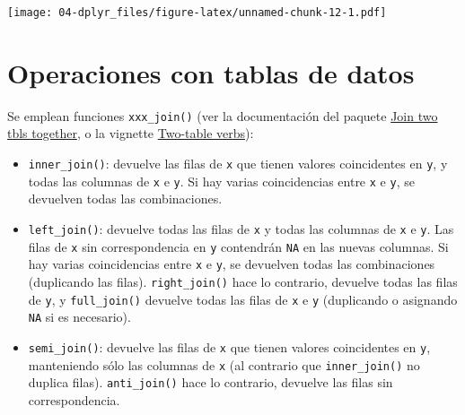 \documentclass[]{book}
\newenvironment{Shaded}{\begin{snugshade}}{\end{snugshade}}
\newcommand{\KeywordTok}[1]{\textcolor[rgb]{0.13,0.29,0.53}{\textbf{#1}}}
\newcommand{\DataTypeTok}[1]{\textcolor[rgb]{0.13,0.29,0.53}{#1}}
\newcommand{\DecValTok}[1]{\textcolor[rgb]{0.00,0.00,0.81}{#1}}
\newcommand{\StringTok}[1]{\textcolor[rgb]{0.31,0.60,0.02}{#1}}
\newcommand{\OperatorTok}[1]{\textcolor[rgb]{0.81,0.36,0.00}{\textbf{#1}}}
\newcommand{\NormalTok}[1]{#1}
\begin{document}
\begin{Shaded}
\end{Shaded}

\texttt{[image: 04-dplyr\_files/figure-latex/unnamed-chunk-12-1.pdf]}

\section{Operaciones con tablas de
datos}\label{operaciones-con-tablas-de-datos-1}

Se emplean funciones \texttt{xxx\_join()} (ver la documentación del
paquete \href{https://dplyr.tidyverse.org/reference/join.html}{Join two
tbls together}, o la vignette
\href{https://dplyr.tidyverse.org/articles/two-table.html}{Two-table
verbs}):

\begin{itemize}
\item
  \texttt{inner\_join()}: devuelve las filas de \texttt{x} que tienen
  valores coincidentes en \texttt{y}, y todas las columnas de \texttt{x}
  e \texttt{y}. Si hay varias coincidencias entre \texttt{x} e
  \texttt{y}, se devuelven todas las combinaciones.
\item
  \texttt{left\_join()}: devuelve todas las filas de \texttt{x} y todas
  las columnas de \texttt{x} e \texttt{y}. Las filas de \texttt{x} sin
  correspondencia en \texttt{y} contendrán \texttt{NA} en las nuevas
  columnas. Si hay varias coincidencias entre \texttt{x} e \texttt{y},
  se devuelven todas las combinaciones (duplicando las filas).
  \texttt{right\_join()} hace lo contrario, devuelve todas las filas de
  \texttt{y}, y \texttt{full\_join()} devuelve todas las filas de
  \texttt{x} e \texttt{y} (duplicando o asignando \texttt{NA} si es
  necesario).
\item
  \texttt{semi\_join()}: devuelve las filas de \texttt{x} que tienen
  valores coincidentes en \texttt{y}, manteniendo sólo las columnas de
  \texttt{x} (al contrario que \texttt{inner\_join()} no duplica filas).
  \texttt{anti\_join()} hace lo contrario, devuelve las filas sin
  correspondencia.
\end{itemize}
\end{document}
